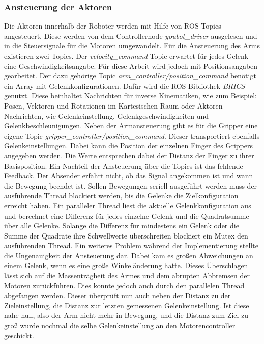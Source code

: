\subsubsection{Ansteuerung der Aktoren}
\label{sec:impl-res-ak}
Die Aktoren innerhalb der Roboter werden mit Hilfe von ROS Topics angesteuert. Diese werden von dem Controllernode \textit{youbot\_driver} ausgelesen und in die Steuersignale für die Motoren umgewandelt. Für die Ansteuerung des Arms existieren zwei Topics. Der \textit{velocity\_command}-Topic erwartet für jedes Gelenk eine Geschwindigkeitsangabe. Für diese Arbeit wird jedoch mit Positionsangaben gearbeitet. Der dazu gehörige Topic \textit{arm\_controller/position\_command} benötigt ein Array mit Gelenkkonfigurationen. Dafür wird die ROS-Bibliothek \textit{BRICS} genutzt. Diese beinhaltet Nachrichten für inverse Kinematiken, wie zum  Beispiel: Posen, Vektoren und Rotationen im Kartesischen Raum oder Aktoren Nachrichten, wie Gelenkeinstellung, Gelenkgeschwindigkeiten und Gelenkbeschleunigungen. Neben der Armansteuerung gibt es für die Gripper eine eigene Topic \textit{gripper\_controller/position\_command}. Dieser transportiert ebenfalls Gelenkeinstellungen. Dabei kann die Position der einzelnen Finger des Grippers angegeben werden. Die Werte entsprechen dabei der Distanz der Finger zu ihrer Basisposition. Ein Nachteil der Ansteuerung über die Topics ist das fehlende Feedback. Der Absender erfährt nicht, ob das Signal angekommen ist und wann die Bewegung beendet ist. Sollen Bewegungen seriell ausgeführt werden muss der ausführende Thread blockiert werden, bis die Gelenke die Zielkonfiguration erreicht haben.  Ein paralleler Thread liest die aktuelle Gelenkkonfiguration aus und berechnet eine Differenz für jedes einzelne Gelenk und die Quadratsumme über alle Gelenke. Solange die Differenz für mindestens ein Gelenk oder die Summe der Quadrate ihre Schwellwerte überschreiten blockiert ein Mutex den ausführenden Thread. Ein weiteres Problem während der Implementierung stellte die Ungenauigkeit der Ansteuerung dar. Dabei kam es großen Abweichungen an einem Gelenk, wenn es eine große Winkeländerung hatte. Dieses Überschlagen lässt sich auf die Massenträgheit des Armes und dem abrupten Abbremsen der Motoren zurückführen. Dies konnte jedoch auch durch den parallelen Thread abgefangen werden. Dieser überprüft nun auch neben der Distanz zu der Zieleinstellung, die Distanz zur letzten gemessenen Gelenkeinstellung. Ist diese nahe null, also der Arm nicht mehr in Bewegung, und die Distanz zum Ziel zu groß wurde nochmal die selbe Gelenkeinstellung an den Motorencontroller geschickt.

